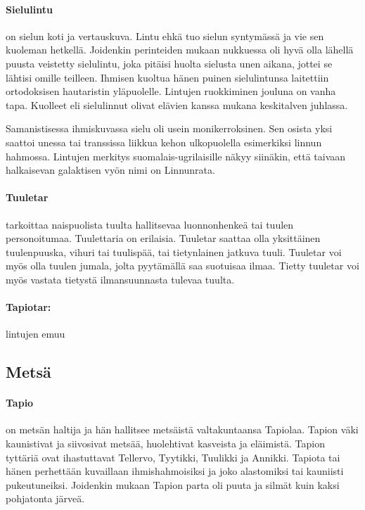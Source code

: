   \paragraph{Sielulintu} on sielun koti ja vertauskuva. Lintu ehkä tuo sielun syntymässä ja 
    vie sen kuoleman hetkellä. Joidenkin perinteiden mukaan nukkuessa oli hyvä olla lähellä 
    puusta veistetty sielulintu, joka pitäisi huolta sielusta unen aikana, jottei se lähtisi 
    omille teilleen. Ihmisen kuoltua hänen puinen sielulintunsa laitettiin ortodoksisen 
    hautaristin yläpuolelle. Lintujen ruokkiminen jouluna on vanha tapa. Kuolleet eli 
    sielulinnut olivat elävien kanssa mukana keskitalven juhlassa. \par Samanistisessa ihmiskuvassa 
    sielu oli usein monikerroksinen. Sen osista yksi saattoi unessa tai transsissa liikkua 
    kehon ulkopuolella esimerkiksi linnun hahmossa. Lintujen merkitys suomalais-ugrilaisille 
    näkyy siinäkin, että taivaan halkaisevan galaktisen vyön nimi on Linnunrata. 
  \paragraph{Tuuletar} tarkoittaa naispuolista tuulta hallitsevaa luonnonhenkeä tai tuulen 
    personoitumaa. Tuulettaria on erilaisia. Tuuletar saattaa olla yksittäinen tuulenpuuska, 
    vihuri tai tuulispää, tai tietynlainen jatkuva tuuli. Tuuletar voi myös olla tuulen jumala, 
    jolta pyytämällä saa suotuisaa ilmaa. Tietty tuuletar voi myös vastata tietystä 
    ilmansuunnasta tulevaa tuulta.
  \paragraph{Tapiotar:} lintujen emuu 


\subsection{Metsä}

  \paragraph{Tapio} on metsän haltija ja hän hallitsee metsäistä valtakuntaansa Tapiolaa. Tapion väki 
    kaunistivat ja siivosivat metsää, huolehtivat kasveista ja eläimistä. Tapion tyttäriä ovat 
    ihastuttavat Tellervo, Tyytikki, Tuulikki ja Annikki. Tapiota tai hänen perhettään 
    kuvaillaan ihmishahmoisiksi ja joko alastomiksi tai kauniisti pukeutuneiksi. Joidenkin mukaan 
    Tapion parta oli puuta ja silmät kuin kaksi pohjatonta järveä.
